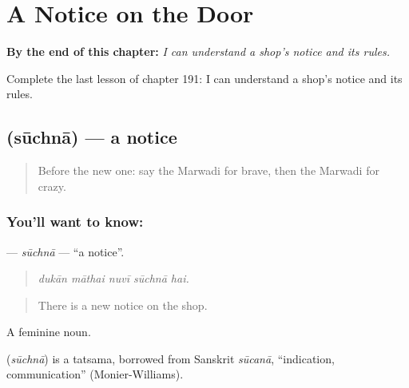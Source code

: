 
\chapter{A Notice on the Door}
\label{ch:mw-a-notice-on-the-door}

\begin{chapteropening}
\textbf{By the end of this chapter:} \emph{I can understand a shop's notice and its rules.}

Complete the last lesson of chapter 191: I can understand a shop's notice and its rules.
\end{chapteropening}

\section[\texorpdfstring{\mw{सूचना} (sūchnā)}{सूचना (sūchnā)}]{ (sūchnā) — a notice}

\label{lesson:MW-C191-suchna}



\begin{quote}
Before the new one: say the Marwadi for brave, then the Marwadi for crazy.
\end{quote}

\subsection*{You'll want to know: }
\textbf{} — \emph{sūchnā} — \textquotedblleft{}a notice\textquotedblright{}.

\begin{quote}
    
\end{quote}

\begin{quote}
\emph{dukān māthai nuvī sūchnā hai.}
\end{quote}

\begin{quote}
There is a new notice on the shop.
\end{quote}

A feminine noun.

\begin{cousinweb}
\textbf{} (\emph{sūchnā}) is a tatsama, borrowed from Sanskrit \emph{sūcanā}, \textquotedblleft{}indication, communication\textquotedblright{} (Monier-Williams).
\end{cousinweb}

